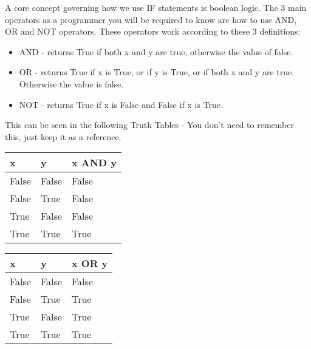 \documentclass[twocolumn]{article}
\begin{document}
A core concept governing how we use IF statements is boolean logic. The 3 main operators as a programmer you will be required to know are how to use AND, OR and NOT operators. These operators work according to these 3 definitions:
\begin{itemize}
	\item AND - returns True if both x and y are true, otherwise the value of false. 
	\item OR - returns True if x is True, or if y is True, or if both x and y are true. Otherwise the value is false.
	\item NOT - returns True if x is False and False if x is True.
\end{itemize}
This can be seen in the following Truth Tables - You don't need to remember this, just keep it as a reference.

\begin{center}
	\begin{tabular}{| l | l || l |} 
		\hline
		x & y & x AND y \\ \hline
		False & False & False \\
		False & True & False \\
		True & False & False \\
		True & True & True \\
		\hline
	\end{tabular}
\end{center}

\begin{center}
	\begin{tabular}{| l | l || l |} 
		\hline
		x & y & x OR y \\ \hline
		False & False & False \\
		False & True & True \\
		True & False & True \\
		True & True & True \\
		\hline
	\end{tabular}
\end{center}
\end{document}
